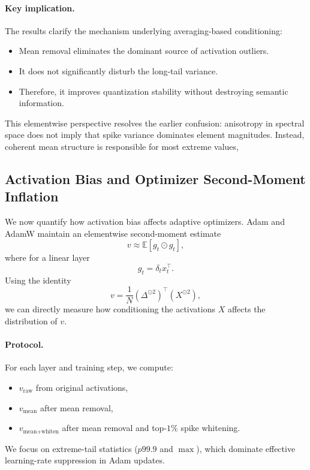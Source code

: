 \paragraph{Key implication.}

The results clarify the mechanism underlying averaging-based conditioning:

\begin{itemize}
    \item Mean removal eliminates the dominant source of activation outliers.
    \item It does not significantly disturb the long-tail variance.
    \item Therefore, it improves quantization stability without destroying semantic information.
\end{itemize}

This elementwise perspective resolves the earlier confusion:
anisotropy in spectral space does not imply that spike variance dominates
element magnitudes.
Instead, coherent mean structure is responsible for most extreme values,

\subsection{Activation Bias and Optimizer Second-Moment Inflation}
\label{subsec:optimizer_bias}

We now quantify how activation bias affects adaptive optimizers.
Adam and AdamW maintain an elementwise second-moment estimate
\[
v \approx \mathbb{E}[g_t \odot g_t],
\]
where for a linear layer
\[
g_t = \delta_t x_t^\top.
\]
Using the identity
\[
v = \frac{1}{N}(\Delta^{\odot 2})^\top (X^{\odot 2}),
\]
we can directly measure how conditioning the activations $X$
affects the distribution of $v$.

\paragraph{Protocol.}
For each layer and training step, we compute:
\begin{itemize}
\item $v_{\text{raw}}$ from original activations,
\item $v_{\text{mean}}$ after mean removal,
\item $v_{\text{mean+whiten}}$ after mean removal and top-$1\%$ spike whitening.
\end{itemize}
We focus on extreme-tail statistics ($p99.9$ and $\max$), which dominate
effective learning-rate suppression in Adam updates.

